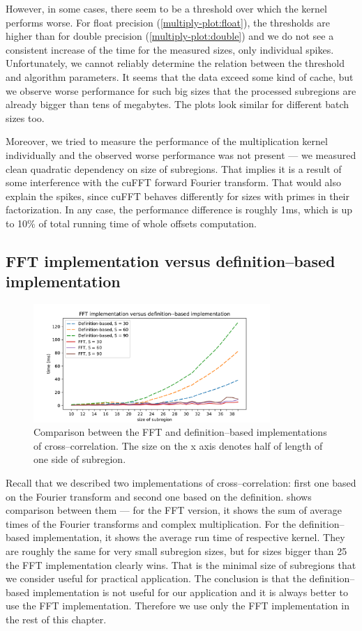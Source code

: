 However, in some cases, there seem to be a threshold over which the kernel performs worse. For float precision (\cref {multiply-plot:float}), the thresholds are higher than for double precision (\cref {multiply-plot:double}) and we do not see a consistent increase of the time for the measured sizes, only individual spikes. Unfortunately, we cannot reliably determine the relation between the threshold and algorithm parameters. It seems that the data exceed some kind of cache, but we observe worse performance for such big sizes that the processed subregions are already bigger than tens of megabytes. The plots look similar for different batch sizes too.

Moreover, we tried to measure the performance of the multiplication kernel individually and the observed worse performance was not present --- we measured clean quadratic dependency on size of subregions. That implies it is a result of some interference with the cuFFT forward Fourier transform. That would also explain the spikes, since cuFFT behaves differently for sizes with primes in their factorization. In any case, the performance difference is roughly 1ms, which is up to 10\% of total running time of whole offsets computation.

\subsection{FFT implementation versus definition--based implementation}

\begin{figure}
	\centering
	\includegraphics[width=0.8\textwidth]{img/eval/cross-compare}
	\caption{Comparison between the FFT and definition--based implementations of cross--correlation. The size on the x axis denotes half of length of one side of subregion.}
	\label{cross-compare}
\end{figure}

Recall that we described two implementations of cross--correlation: first one based on the Fourier transform and second one based on the definition.  shows comparison between them --- for the FFT version, it shows the sum of average times of the Fourier transforms and complex multiplication. For the definition--based implementation, it shows the average run time of respective kernel. They are roughly the same for very small subregion sizes, but for sizes bigger than 25 the FFT implementation clearly wins. That is the minimal size of subregions that we consider useful for practical application. The conclusion is that the definition--based implementation is not useful for our application and it is always better to use the FFT implementation. Therefore we use only the FFT implementation in the rest of this chapter.


